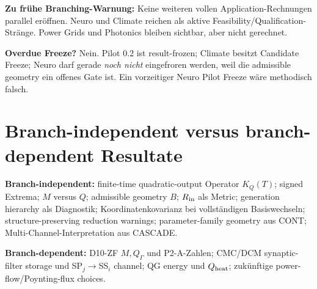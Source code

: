 \textbf{Zu frühe Branching-Warnung:} Keine weiteren vollen Application-Rechnungen parallel eröffnen. Neuro und Climate reichen als aktive Feasibility/Qualification-Stränge. Power Grids und Photonics bleiben sichtbar, aber nicht gerechnet.

\textbf{Overdue Freeze?} Nein. Pilot 0.2 ist result-frozen; Climate besitzt Candidate Freeze; Neuro darf gerade \emph{noch nicht} eingefroren werden, weil die admissible geometry ein offenes Gate ist. Ein vorzeitiger Neuro Pilot Freeze wäre methodisch falsch.

\section{Branch-independent versus branch-dependent Resultate}
\textbf{Branch-independent:} finite-time quadratic-output Operator $K_Q(T)$; signed Extrema; $M$ versus $Q$; admissible geometry $B$; $R_{\rm in}$ als Metric; generation hierarchy als Diagnostik; Koordinatenkovarianz bei vollständigen Basiswechseln; structure-preserving reduction warnings; parameter-family geometry aus CONT; Multi-Channel-Interpretation aus CASCADE.

\textbf{Branch-dependent:} D10-ZF $M,Q_\Gamma$ und P2-A-Zahlen; CMC/DCM synaptic-filter storage und SP$_j\to$SS$_i$ channel; QG energy und $Q_{\rm heat}$; zukünftige power-flow/Poynting-flux choices.

